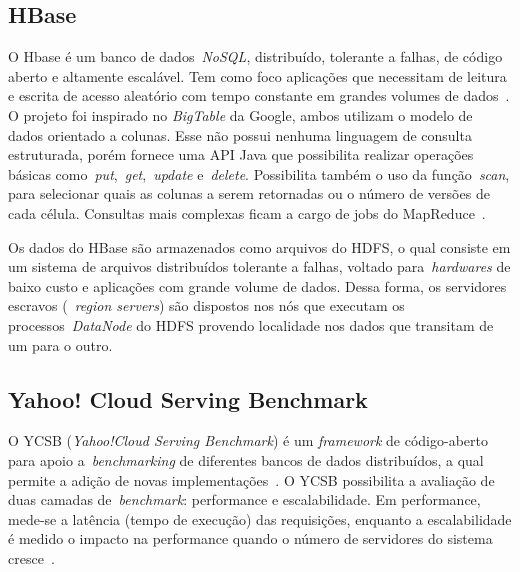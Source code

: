 \documentclass[12pt]{article}
\begin{document}

\subsection{HBase}
\label{subsec:hbase}

O Hbase é um banco de dados~\textit{NoSQL}, distribuído, tolerante a falhas, de código aberto e altamente escalável. Tem como foco aplicações que necessitam de leitura e escrita de acesso aleatório com tempo constante em grandes volumes de dados~\cite{hadoophbase}. O projeto foi inspirado no \textit{BigTable} da Google, ambos utilizam o modelo de dados orientado a colunas. Esse não possui nenhuma linguagem de consulta estruturada, porém fornece uma API Java que possibilita realizar operações básicas como~\emph{put},~\emph{get},~\emph{update} e~\emph{delete}. Possibilita também o uso da função~\emph{scan}, para selecionar quais as colunas a serem retornadas ou o número de versões de cada célula. Consultas mais complexas ficam a cargo de jobs do MapReduce~\cite{cunha2015column}.

Os dados do HBase são armazenados como arquivos do HDFS, o qual consiste em um sistema de arquivos distribuídos tolerante a falhas, voltado para~\emph{hardwares} de baixo custo e aplicações com grande volume de dados. Dessa forma, os servidores escravos (~\emph{region servers}) são dispostos nos nós que executam os processos~\emph{DataNode} do HDFS provendo localidade nos dados que transitam de um para o outro.

\subsection{Yahoo! Cloud Serving Benchmark}
\label{subsec:ycsb}

O YCSB (\emph{Yahoo!Cloud Serving Benchmark}) é um \textit{framework} de código-aberto para apoio a~\emph{benchmarking} de diferentes bancos de dados distribuídos, a qual permite a adição de novas implementações~\cite{cooper2010benchmarking}. 
O YCSB possibilita a avaliação de duas camadas de~\textit{benchmark}: performance e escalabilidade. 
Em performance, mede-se a latência (tempo de execução) das requisições, enquanto a escalabilidade é medido o impacto na performance quando o número de servidores do sistema cresce~\cite{cooper2010benchmarking}.
\end{document}

